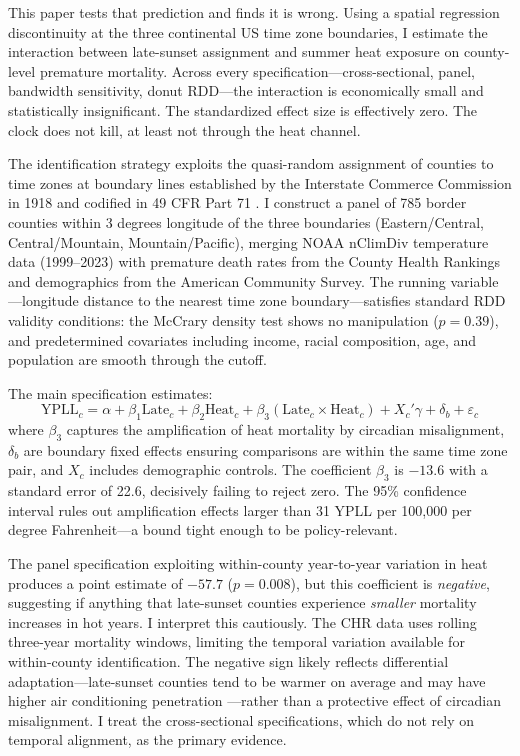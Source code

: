 \documentclass[12pt]{article}
\begin{document}
This paper tests that prediction and finds it is wrong. Using a spatial regression discontinuity at the three continental US time zone boundaries, I estimate the interaction between late-sunset assignment and summer heat exposure on county-level premature mortality. Across every specification---cross-sectional, panel, bandwidth sensitivity, donut RDD---the interaction is economically small and statistically insignificant. The standardized effect size is effectively zero. The clock does not kill, at least not through the heat channel.

The identification strategy exploits the quasi-random assignment of counties to time zones at boundary lines established by the Interstate Commerce Commission in 1918 and codified in 49 CFR Part 71 \citep{hamermesh2008cues}. I construct a panel of 785 border counties within 3 degrees longitude of the three boundaries (Eastern/Central, Central/Mountain, Mountain/Pacific), merging NOAA nClimDiv temperature data (1999--2023) with premature death rates from the County Health Rankings \citep{chr2024} and demographics from the American Community Survey. The running variable---longitude distance to the nearest time zone boundary---satisfies standard RDD validity conditions: the McCrary density test shows no manipulation ($p = 0.39$), and predetermined covariates including income, racial composition, age, and population are smooth through the cutoff.

The main specification estimates:
\begin{equation}
\text{YPLL}_{c} = \alpha + \beta_1 \text{Late}_c + \beta_2 \text{Heat}_c + \beta_3 (\text{Late}_c \times \text{Heat}_c) + X_c'\gamma + \delta_b + \varepsilon_c
\end{equation}
where $\beta_3$ captures the amplification of heat mortality by circadian misalignment, $\delta_b$ are boundary fixed effects ensuring comparisons are within the same time zone pair, and $X_c$ includes demographic controls. The coefficient $\beta_3$ is $-13.6$ with a standard error of 22.6, decisively failing to reject zero. The 95\% confidence interval rules out amplification effects larger than 31 YPLL per 100,000 per degree Fahrenheit---a bound tight enough to be policy-relevant.

The panel specification exploiting within-county year-to-year variation in heat produces a point estimate of $-57.7$ ($p = 0.008$), but this coefficient is \textit{negative}, suggesting if anything that late-sunset counties experience \textit{smaller} mortality increases in hot years. I interpret this cautiously. The CHR data uses rolling three-year mortality windows, limiting the temporal variation available for within-county identification. The negative sign likely reflects differential adaptation---late-sunset counties tend to be warmer on average and may have higher air conditioning penetration \citep{barreca2016adapting}---rather than a protective effect of circadian misalignment. I treat the cross-sectional specifications, which do not rely on temporal alignment, as the primary evidence.
\end{document}

